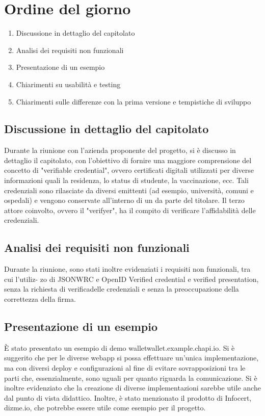 \section{Ordine del giorno}
\begin{enumerate}
\item Discussione in dettaglio del capitolato
\item Analisi dei requisiti non funzionali
\item Presentazione di un esempio
\item Chiarimenti su usabilità e testing
\item Chiarimenti sulle differenze con la prima versione e tempistiche di sviluppo
\end{enumerate}

\subsection{Discussione in dettaglio del capitolato}
Durante la riunione con l’azienda proponente del progetto, si è discusso in dettaglio il
capitolato\glo, con l’obiettivo di fornire una maggiore comprensione del concetto di "verifiable
credential", ovvero certificati digitali utilizzati per diverse informazioni quali la residenza,
lo status di studente, la vaccinazione, ecc. Tali credenziali sono rilasciate da diversi
emittenti (ad esempio, università, comuni e ospedali) e vengono conservate all’interno di
un \glo da parte del titolare. Il terzo attore coinvolto, ovvero il "verifyer", ha il compito
di verificare l’affidabilità delle credenziali.

\subsection{Analisi dei requisiti non funzionali}
Durante la riunione, sono stati inoltre evidenziati i requisiti non funzionali, tra cui l’utiliz-
zo di JSON\glo WRC e OpenID Verified credential e verified presentation, senza la richiesta
di verifica\glo delle credenziali e senza la preoccupazione della correttezza della firma.

\subsection{Presentazione di un esempio}
È stato presentato un esempio di demo wallet\glo wallet.example.chapi.io. Si è suggerito
che per le diverse webapp si possa effettuare un’unica implementazione, ma con diversi
deploy e configurazioni al fine di evitare sovrapposizioni tra le parti che, essenzialmente,
sono uguali per quanto riguarda la comunicazione. Si è inoltre evidenziato che la creazione
di diverse implementazioni sarebbe utile anche dal punto di vista didattico. Inoltre, è stato
menzionato il prodotto di Infocert, dizme.io, che potrebbe essere utile come esempio per
il progetto.

